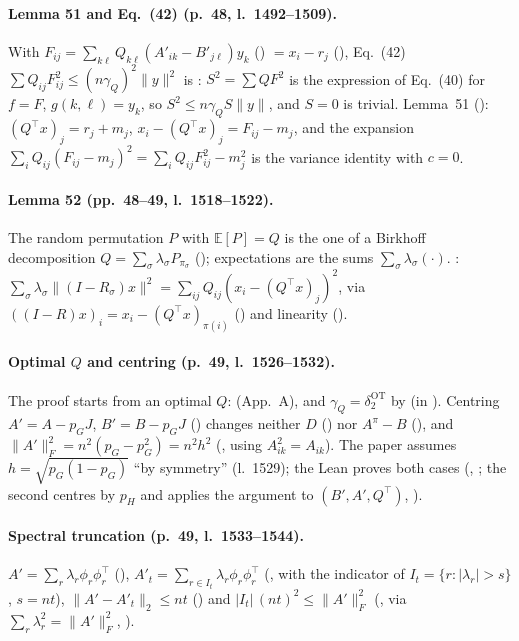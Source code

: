 \paragraph{Lemma 51 and Eq.~(42) (p.~48, l.~1492--1509).} With $F_{ij}=\sum_{k\ell}Q_{k\ell}(A'_{ik}-B'_{j\ell})y_k$
() $=x_i-r_j$ (), Eq.~(42) $\sum Q_{ij}F_{ij}^2\le(n\gamma_Q)^2\|y\|^2$ is :
$S^2=\sum QF^2$ is the expression of Eq.~(40) for $f=F$, $g(k,\ell)=y_k$, so $S^2\le n\gamma_Q S\|y\|$, and
$S=0$ is trivial. Lemma~51 (): $(Q^\top x)_j=r_j+m_j$, $x_i-(Q^\top x)_j=F_{ij}-m_j$, and the
expansion $\sum_iQ_{ij}(F_{ij}-m_j)^2=\sum_iQ_{ij}F_{ij}^2-m_j^2$ is the variance identity
 with $c=0$.

\paragraph{Lemma 52 (pp.~48--49, l.~1518--1522).} The random permutation $P$ with $\mathbb E[P]=Q$ is the one of a Birkhoff
decomposition $Q=\sum_\sigma\lambda_\sigma P_{\pi_\sigma}$ (); expectations are
the sums $\sum_\sigma\lambda_\sigma(\cdot)$. : $\sum_\sigma\lambda_\sigma\|(I-R_\sigma)x\|^2=
\sum_{ij}Q_{ij}(x_i-(Q^\top x)_j)^2$, via $((I-R)x)_i=x_i-(Q^\top x)_{\pi(i)}$ () and
linearity ().

\paragraph{Optimal $Q$ and centring (p.~49, l.~1526--1532).} The proof starts from an optimal $Q$:
 (App.~A), and $\gamma_Q=\delta^{\mathrm{OT}}_2$ by 
(in ). Centring $A'=A-p_GJ$, $B'=B-p_GJ$ () changes neither $D$
() nor $A^\pi-B$ (), and $\|A'\|_F^2=n^2(p_G-p_G^2)=n^2h^2$
(, using $A_{ik}^2=A_{ik}$). The paper assumes $h=\sqrt{p_G(1-p_G)}$ ``by symmetry'' (l.~1529);
the Lean proves both cases (, ; the second centres by
$p_H$ and applies the argument to $(B',A',Q^\top)$, ).

\paragraph{Spectral truncation (p.~49, l.~1533--1544).} $A'=\sum_r\lambda_r\phi_r\phi_r^\top$
(), $A'_t=\sum_{r\in I_t}\lambda_r\phi_r\phi_r^\top$ (, with the indicator
 of $I_t=\{r:|\lambda_r|>s\}$, $s=nt$), $\|A'-A'_t\|_2\le nt$ () and
$|I_t|\,(nt)^2\le\|A'\|_F^2$ (, via $\sum_r\lambda_r^2=\|A'\|_F^2$,
).

